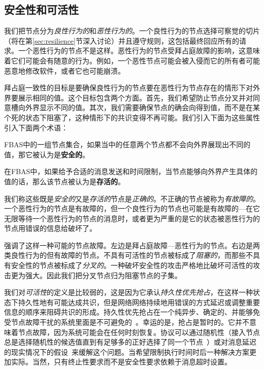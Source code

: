 \subsection{安全性和可活性}\label{sec:fba-safe-live}

我们把节点分为\textit{良性行为的}和\textit{恶性行为的}。一个良性行为的节点选择可察觉的{\quorum}切片（将在第\ref{sec:resilience}节深入讨论）并且遵守规则，这包括最终回应所有的请求。一个恶性行为的节点不是这样。恶性行为的节点受拜占庭故障的影响，这意味着它们可能会有随意的行为。例如，一个恶性节点可能会被入侵而它的所有者可能恶意地修改软件，或者它也可能崩溃。

拜占庭一致性的目标是要确保良性行为的节点要在恶性行为节点存在的情形下对外界要展示相同的值。这个目标包含两个方面。首先，我们希望防止节点分叉并对同意槽向外界显示不同的值。其次，我们需要确保节点的确会向得到值，而不是在某个死的状态下阻塞了，这种情形下的共识变得不再可能。我们引入下面为这些属性引入下面两个术语：

\begin{definition}[安全性]
	FBAS中的一组节点集合，如果当中的任意两个节点都不会向外界展现出不同的值，那它被认为是{\textbf{安全的}}。
\end{definition}

\begin{definition}[可活性]
	在FBAS中，如果给予合适的消息发送和时间限制，当节点能够向外界产生具体的值的话，那么该节点被认为是{\textbf{存活的}}。
\end{definition}

我们称这些既是\textit{安全的}又是\textit{存活的}节点是\textit{正确的}。不正确的节点被称为{\textit{有故障的}}。一个恶性行为的节点是有故障的，但一个良性行为的节点也可能是有故障的---在它无限等待一个恶性行为的节点的消息时，或者更为严重的是它的状态被恶性行为的节点用错误的信息给破坏了。

强调了这样一种可能的节点故障。左边是拜占庭故障---恶性行为的节点。右边是两类良性行为的但有故障的节点。不具有可活性的节点被标成了\textit{阻塞的}，而那些不具有安全性的节点被标成了\textit{分叉的}。一种破坏安全性的攻击严格地比破坏可活性的攻击更为强大。因此我们把分叉节点归为阻塞节点的子集。

我们对\textit{可活性}的定义是比较弱的，这是因为它承认\textit{持久性优先抢占}，在这样一种状态下持久性地有可能达成共识，但是网络网络持续地用错误的方式延迟或调整重要信息的顺序来阻碍共识的形成。持久性优先抢占在一个纯异步、确定的、并能够免受节点故障干扰的系统里面是不可避免的~\cite{Fischer:1985}。幸运的是，抢占是暂时的。它并不意味着节点故障，因为系统可能会在任何时刻恢复。协议可以通过随机性（接入节点总是选择随机性的候选值直到有足够多的正好选择了同一个节点~\cite{Ben-Or:1983:AFC:800221.806707,Bracha:1985:ACB:4221.214134}）或对消息延迟的现实情况下的假设~\cite{Dwork:1988:CPP:42282.42283}来缓解这个问题。当希望限制执行时间时后一种解决方案更加实际。当然，只有终止性要求而不是安全性要求依赖于消息超时设置。


